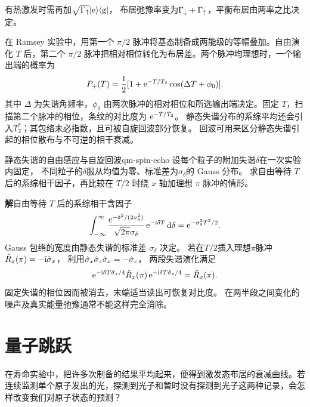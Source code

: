 有热激发时需再加$\sqrt{\Gamma_{\mathord{\uparrow}}}\lvert\mathrm{e}\rangle\langle\mathrm{g}\rvert$，
布居弛豫率变为$\Gamma_\downarrow + \Gamma_{\mathord{\uparrow}}$，平衡布居由两率之比决定。

在 Ramsey 实验中，用第一个 $\pi/2$ 脉冲将基态制备成两能级的等幅叠加。自由演化 $T$ 后，第二个 $\pi/2$ 脉冲把相对相位转化为布居差。两个脉冲均理想时，一个输出端的概率为
\begin{equation}
    P_+(T) = \frac12[1 + \mathop{}\!\mathrm{e}^{-T/T_2}\cos(\Delta T + \phi_0)] .
\end{equation}
其中 $\Delta$ 为失谐角频率，$\phi_0$ 由两次脉冲的相对相位和所选输出端决定。固定 $T$，扫描第二个脉冲的相位，条纹的对比度为 $\mathop{}\!\mathrm{e}^{-T/T_2}$。
静态失谐分布的系综平均还会引入$T_2^*$；其包络未必指数，且可被自旋回波部分恢复。
回波可用来区分静态失谐引起的相位散布与不可逆的相干衰减。

\begin{example}{静态失谐的自由感应与自旋回波}{qm-spin-echo}
    设每个粒子的附加失谐$\delta$在一次实验内固定，
    不同粒子的$\delta$服从均值为零、标准差为$\sigma_\delta$的 Gauss 分布。
    求自由等待 $T$ 后的系综相干因子，再比较在 $T/2$ 时绕 $x$ 轴加理想 $\pi$ 脉冲的情形。

    \par\smallskip\textbf{解}\quad 自由等待 $T$ 后的系综相干含因子
    \begin{equation}
        \int_{-\infty}^\infty
        \frac{\mathop{}\!\mathrm{e}^{-\delta^2/(2\sigma_\delta^2)}}{\sqrt{2\pi}\sigma_\delta}
        \mathop{}\!\mathrm{e}^{-\mathrm{i}\delta T}\mathop{}\!\mathrm{d}\delta
        = \mathop{}\!\mathrm{e}^{-\sigma_\delta^2T^2/2}.
    \end{equation}
    Gauss 包络的宽度由静态失谐的标准差 $\sigma_\delta$ 决定。
    若在$T/2$插入理想$\pi$脉冲$\hat{R}_x(\pi) = -\mathrm{i}\hat{\sigma}_x$，
    利用$\hat{\sigma}_x\hat{\sigma}_z\hat{\sigma}_x = -\hat{\sigma}_z$，
    两段失谐演化满足
    \begin{equation}
        \mathop{}\!\mathrm{e}^{-\mathrm{i}\delta T\hat{\sigma}_z/4}
        \hat{R}_x(\pi)
        \mathop{}\!\mathrm{e}^{-\mathrm{i}\delta T\hat{\sigma}_z/4}
        = \hat{R}_x(\pi).
    \end{equation}
    固定失谐的相位因而被消去，末端适当读出可恢复对比度。
    在两半段之间变化的噪声及真实能量弛豫通常不能这样完全消除。
\end{example}

\section{量子跳跃}
在寿命实验中，把许多次制备的结果平均起来，便得到激发态布居的衰减曲线。若连续监测单个原子发出的光，探测到光子和暂时没有探测到光子这两种记录，会怎样改变我们对原子状态的预测？

